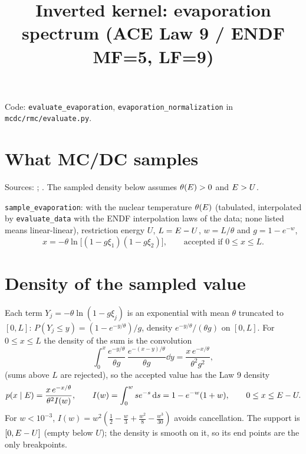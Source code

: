 \documentclass[11pt]{article}
\title{Inverted kernel: evaporation spectrum (ACE Law 9 / ENDF MF=5, LF=9)}
\date{}
\begin{document}
\maketitle

\noindent Code: \texttt{evaluate\_evaporation}, \texttt{evaporation\_normalization} in
\texttt{mcdc/rmc/evaluate.py}.

\section{What MC/DC samples}

\noindent Sources: ; .
The sampled density below assumes $\theta(E)>0$ and $E>U$.

\texttt{sample\_evaporation}: with the nuclear temperature $\theta(E)$ (tabulated,
interpolated by \texttt{evaluate\_data} with the ENDF interpolation laws of the data;
none listed means linear-linear), restriction energy $U$, $L = E - U$,
$w = L/\theta$ and $g = 1 - e^{-w}$,
\begin{equation}
  x = -\theta\ln\big[(1 - g\xi_1)(1 - g\xi_2)\big],\qquad \text{accepted if } 0 \le x \le L .
\end{equation}

\section{Density of the sampled value}

Each term $Y_j = -\theta\ln(1 - g\xi_j)$ is an exponential with mean $\theta$
truncated to $[0, L]$: $P(Y_j \le y) = (1 - e^{-y/\theta})/g$, density
$e^{-y/\theta}/(\theta g)$ on $[0, L]$. For $0 \le x \le L$ the density of the sum is
the convolution
\begin{equation}
  \int_0^{x}\frac{e^{-y/\theta}}{\theta g}\,\frac{e^{-(x-y)/\theta}}{\theta g}\dd y
  = \frac{x\,e^{-x/\theta}}{\theta^2 g^2} ,
\end{equation}
(sums above $L$ are rejected), so the accepted value has the Law 9 density
\begin{equation}
  p(x \mid E) = \frac{x\,e^{-x/\theta}}{\theta^2 I(w)},\qquad
  I(w) = \int_0^w s e^{-s}\,\mathrm{d} s = 1 - e^{-w}(1 + w),\qquad 0 \le x \le E - U .
\end{equation}
For $w < 10^{-3}$, $I(w) = w^2\left(\tfrac12 - \tfrac w3 + \tfrac{w^2}{8} -
\tfrac{w^3}{30}\right)$ avoids cancellation. The support is $[0, E - U]$ (empty below
$U$); the density is smooth on it, so its end points are the only breakpoints.
\end{document}
